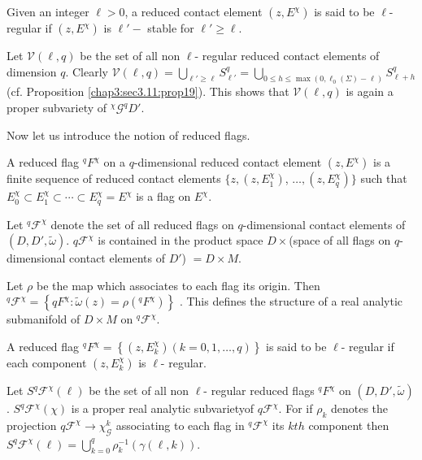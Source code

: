\begin{defi*}
  Given an integer $\ell > 0 $, a reduced contact element $(z, E^\chi)$
  is said to be $\ell$- regular if $(z, E^\chi)$ is $\ell'-$ stable for
  $\ell' \geq \ell$.  

  Let $\mathscr{V}(\ell, q)$ be the set of all non $\ell$- regular
  reduced contact elements of dimension $q$. Clearly $\mathscr{V}
  (\ell, q)= \bigcup\limits_{\ell' \geq \ell} S^q_{\ell'}= \bigcup\limits_{0
    \leq h \leq \max (0, \ell_0 (\Sigma)-\ell)} S^q_{\ell + h}
  $(cf. Proposition \ref{chap3:sec3.11:prop19}). This shows that
  $\mathscr{V}(\ell, q)$ is 
  again a proper subvariety of $^{\chi} \mathscr{G}^q D'$. 
\end{defi*}

Now let us introduce the notion of reduced flags.

\begin{defi*}
  A reduced flag $^{q} F^\chi$ on a $q$-dimensional reduced contact
  element $(z, E^{\chi})$ is a finite sequence of reduced contact
  elements $\Big\{z, (z, E^{\chi}_1)$, $\ldots , (z, E^{\chi}_q)
  \Big\}$ such that $E^{\chi}_0 \subset E^{\chi}_1 \subset \cdots
  \subset E^{\chi}_q = E^{\chi}$ is a flag on $E^{\chi}$. 
\end{defi*}

Let $^{q} \mathscr{F}^\chi$ denote the set of all reduced flags on
$q$-dimensional contact elements of $(D, D',
\tilde{\omega})$. $q\mathscr{F}^\chi$ is contained in the product
space $D \times $(space of all flags on $q$-dimensional contact
elements of $D'$) $=D \times M$. 

Let $\rho $ be the map which associates to each flag its origin. Then
$^{q}\mathscr{F}^\chi= \left\{ q F^\chi : \tilde{\omega} (z) = \rho
(^{q} F^\chi ) \right\}$ . This defines the structure of a real
analytic submanifold of $D \times M$ on $^{q} \mathscr{F}^\chi$. 

\begin{defi*}
  A reduced flag $^{q} F^\chi= \left\{ (z, E^\chi_k) (k=0 , 1,\ldots ,
  q)\right\} $ is said to be $\ell$- regular if each component $(z,
  E^\chi_k)$ is $\ell$- regular. 
\end{defi*}

Let $S^q \mathscr{F}^\chi (\ell)$ be the set of all non $\ell$-
regular reduced flags $^{q}F^\chi $ on $(D,D', \tilde{\omega})$. $S^q
\mathscr{F}^\chi (\chi)$ is a proper real analytic subvariety\pageoriginale of
${q}\mathscr{F}^\chi$. For if $\rho_k$ denotes the projection
${q}\mathscr{F}^\chi \rightarrow \chi_{\mathscr{G}}^k$ associating to
each flag in $^q \mathscr{F}^\chi$ its $kth$ component then $S^q
\mathscr{F}^\chi (\ell)= \bigcup\limits^q_{k=0} \rho^{-1}_{k}(\gamma
(\ell, k)) $. 

